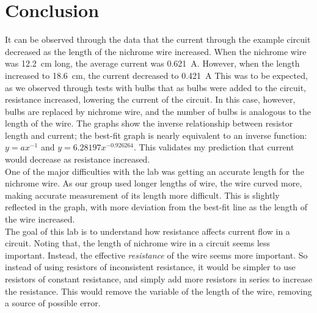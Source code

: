 \documentclass{article}
\numberwithin{equation}{subsection}
\begin{document}
        \section{Conclusion}
            It can be observed through the data that the current through the example
            circuit decreased as the length of the nichrome wire increased. When
            the nichrome wire was \SI{12.2}{\cm} long, the average current was
            \SI{0.621}{\A}. However, when the length increased to \SI{18.6}{\cm},
            the current decreased to \SI{0.421}{\A} This was to be expected, as we
            observed through tests with bulbs that as bulbs were added to the circuit,
            resistance increased, lowering the current of the circuit. In this case,
            however, bulbs are replaced by nichrome wire, and the number of bulbs
            is analogous to the length of the wire. The graphs show the inverse
            relationship between resistor length and current; the best-fit graph
            is nearly equivalent to an inverse function: \(y=ax^{-1}\) and
            \(y=6.28197x^{-0.926264}\). This validates my prediction that current
            would decrease as resistance increased.\\
            One of the major difficulties with the lab was getting an accurate length
            for the nichrome wire. As our group used longer lengths of wire, the wire
            curved more, making accurate measurement of its length more difficult. This
            is slightly reflected in the graph, with more deviation from the best-fit
            line as the length of the wire increased.\\
            The goal of this lab is to understand how resistance affects current flow
            in a circuit. Noting that, the length of nichrome wire in a circuit seems
            less important. Instead, the effective \textit{resistance} of the wire
            seems more important. So instead of using resistors of inconsistent resistance,
            it would be simpler to use resistors of constant resistance, and simply
            add more resistors in series to increase the resistance. This would remove
            the variable of the length of the wire, removing a source of possible error.
\end{document}
